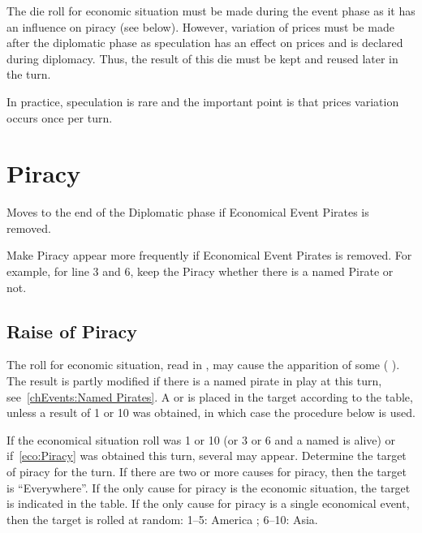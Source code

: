 \begin{designnote}
  The die roll for economic situation must be made during the event
  phase as it has an influence on piracy (see below). However, variation
  of prices must be made after the diplomatic phase as speculation has
  an effect on prices and is declared during diplomacy. Thus, the result
  of this die must be kept and reused later in the turn.

  In practice, speculation is rare and the important point is that
  prices variation occurs once per turn.
\end{designnote}


\section{Piracy}\label{chEvents:Piracy}

\begin{todo}
  [TBD] Moves to the end of the Diplomatic phase if Economical Event
  Pirates is removed.
\end{todo}

\begin{todo}
  [TBD] Make Piracy appear more frequently if Economical Event Pirates
  is removed. For example, for line 3 and 6, keep the Piracy whether
  there is a named Pirate or not.
\end{todo}


\subsection{Raise of Piracy}

\aparag The roll for economic situation, read in , may cause the apparition of some \PIRATE
( \corsaire). The result is partly modified if there is a
named pirate in play at this turn, see~\ref{chEvents:Named Pirates}.
\bparag A \PIRATE \corsaire\facemoins or \PIRATE \corsaire\faceplus is
placed in the target \STZ according to the table, unless a result of 1
or 10 was obtained, in which case the procedure below is used.

\aparag If the economical situation roll was 1 or 10 (or 3 or 6 and a
named  \LeaderA is alive) or if~\ref{eco:Piracy} was
obtained this turn, several \PIRATE may appear. Determine the target of
piracy for the turn.
\bparag If there are two or more causes for piracy, then the target is
``Everywhere''.
\bparag If the only cause for piracy is the economic situation, the
target is indicated in the table.
\bparag If the only cause for piracy is a single economical event, then
the target is rolled at random: 1--5: America ; 6--10: Asia.

